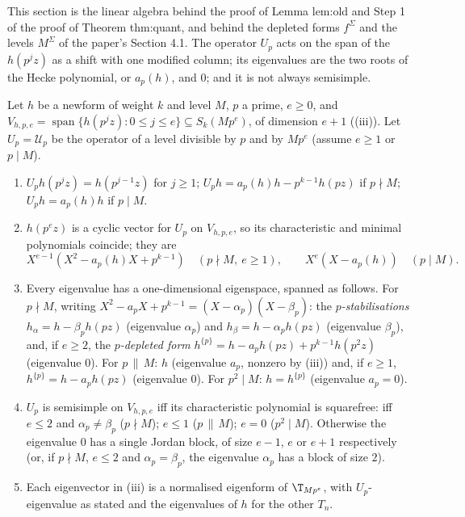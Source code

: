 This section is the linear algebra behind the proof of Lemma lem:old and Step 1 of the proof of Theorem thm:quant, and behind the depleted forms $f^\Sigma$ and the levels
$M^\Sigma$ of the paper's Section 4.1. The operator $U_p$ acts on the span of the $h(p^jz)$ as a shift with one modified column; its eigenvalues are the two roots of the
Hecke polynomial, or $a_p(h)$, and $0$; and it is not always semisimple.

\begin{proposition}\label{prop:hecke:Up-oldspan}
Let $h$ be a newform of weight $k$ and level $M$, $p$ a prime, $e\ge0$, and $V_{h,p,e}=\operatorname{span}\{h(p^jz):0\le j\le e\}\subseteq S_k(Mp^e)$, of dimension $e+1$
((iii)). Let $U_p=\mathcal U_p$ be the operator of a level divisible by $p$ and by $Mp^e$ (assume $e\ge1$ or $p\mid M$).
\begin{enumerate}[label=(\roman*)]
\item $U_ph(p^jz)=h(p^{j-1}z)$ for $j\ge1$; $U_ph=a_p(h)h-p^{k-1}h(pz)$ if $p\nmid M$; $U_ph=a_p(h)h$ if $p\mid M$.
\item $h(p^ez)$ is a cyclic vector for $U_p$ on $V_{h,p,e}$, so its characteristic and minimal polynomials coincide; they are
\[
X^{e-1}(X^2-a_p(h)X+p^{k-1})\quad(p\nmid M,\ e\ge1),\qquad X^{e}(X-a_p(h))\quad(p\mid M).
\]
\item Every eigenvalue has a one-dimensional eigenspace, spanned as follows. For $p\nmid M$, writing $X^2-a_pX+p^{k-1}=(X-\alpha_p)(X-\beta_p)$: the \emph{$p$-stabilisations} $h_\alpha=h-\beta_ph(pz)$
(eigenvalue $\alpha_p$) and $h_\beta=h-\alpha_ph(pz)$ (eigenvalue $\beta_p$), and, if $e\ge2$, the \emph{$p$-depleted form} $h^{\{p\}}=h-a_ph(pz)+p^{k-1}h(p^2z)$ (eigenvalue $0$). For $p\,\|\,M$: $h$
(eigenvalue $a_p$, nonzero by (iii)) and, if $e\ge1$, $h^{\{p\}}=h-a_ph(pz)$ (eigenvalue $0$). For $p^2\mid M$: $h=h^{\{p\}}$ (eigenvalue $a_p=0$).
\item $U_p$ is semisimple on $V_{h,p,e}$ iff its characteristic polynomial is squarefree: iff $e\le2$ and $\alpha_p\ne\beta_p$ ($p\nmid M$); $e\le1$ ($p\,\|\,M$); $e=0$ ($p^2\mid M$). Otherwise the
eigenvalue $0$ has a single Jordan block, of size $e-1$, $e$ or $e+1$ respectively (or, if $p\nmid M$, $e\le2$ and $\alpha_p=\beta_p$, the eigenvalue $\alpha_p$ has a block of size $2$).
\item Each eigenvector in (iii) is a normalised eigenform of $\T_{Mp^e}$, with $U_p$-eigenvalue as stated and the eigenvalues of $h$ for the other $T_n$.
\end{enumerate}
\end{proposition}

